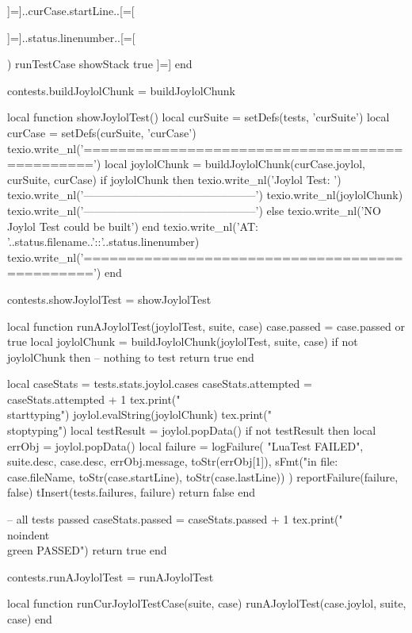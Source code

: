   ]=]..curCase.startLine..[=[

  ]=]..status.linenumber..[=[

)
runTestCase
showStack
true
]=]
end

contests.buildJoylolChunk = buildJoylolChunk

local function showJoylolTest()
  local curSuite = setDefs(tests, 'curSuite')
  local curCase  = setDefs(curSuite, 'curCase')
  texio.write_nl('===============================================')
  local joylolChunk =
    buildJoylolChunk(curCase.joylol, curSuite, curCase)
  if joylolChunk then
    texio.write_nl('Joylol Test: ')
    texio.write_nl('-----------------------------------------------')
    texio.write_nl(joylolChunk)
    texio.write_nl('-----------------------------------------------')
  else
    texio.write_nl('NO Joylol Test could be built')
  end
  texio.write_nl('AT: '..status.filename..'::'..status.linenumber)
  texio.write_nl('===============================================')
end

contests.showJoylolTest = showJoylolTest
\stopLuaCode

\startLuaCode
local function runAJoylolTest(joylolTest, suite, case)
  case.passed = case.passed or true
  local joylolChunk = buildJoylolChunk(joylolTest, suite, case)
  if not joylolChunk then
    -- nothing to test
    return true
  end

  local caseStats = tests.stats.joylol.cases
  caseStats.attempted = caseStats.attempted + 1
  tex.print("\\starttyping")
  joylol.evalString(joylolChunk)
  tex.print("\\stoptyping")
  local testResult = joylol.popData()
  if not testResult then
    local errObj = joylol.popData()
    local failure = logFailure(
      "LuaTest FAILED",
      suite.desc,
      case.desc,
      errObj.message,
      toStr(errObj[1]),
      sFmt("in file: %
        case.fileName, toStr(case.startLine), toStr(case.lastLine))
      )
    reportFailure(failure, false)
    tInsert(tests.failures, failure)
    return false
  end

  -- all tests passed
  caseStats.passed = caseStats.passed + 1
  tex.print("\\noindent{\\green PASSED}")
  return true
end

contests.runAJoylolTest = runAJoylolTest

local function runCurJoylolTestCase(suite, case)
  runAJoylolTest(case.joylol, suite, case)
end

